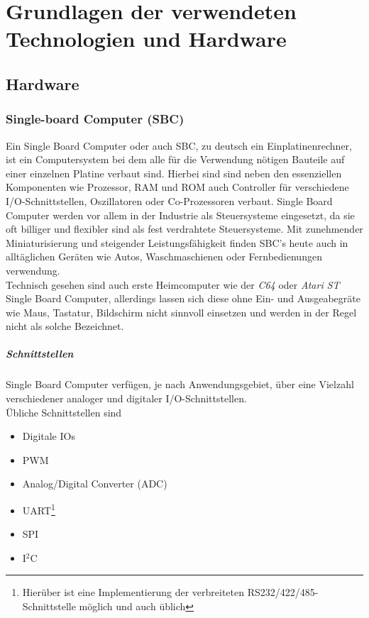 \documentclass[12pt, twoside, a4paper]{scrbook}
\begin{document}
\part[Grundlagen]{Grundlagen der verwendeten Technologien und Hardware}

\chapter{Hardware}

\section{Single-board Computer (SBC)}
Ein Single Board Computer oder auch SBC, zu deutsch ein Einplatinenrechner, ist ein Computersystem bei dem alle für die Verwendung nötigen Bauteile auf einer einzelnen Platine verbaut sind. Hierbei sind sind neben den essenziellen Komponenten wie Prozessor, RAM und ROM auch Controller für verschiedene I/O-Schnittstellen, Oszillatoren oder Co-Prozessoren verbaut. Single Board Computer werden vor allem in der Industrie als Steuersysteme eingesetzt, da sie oft billiger und flexibler sind als fest verdrahtete Steuersysteme. Mit zunehmender Miniaturisierung und steigender Leistungsfähigkeit finden SBC's heute auch in alltäglichen Geräten wie Autos, Waschmaschienen oder Fernbedienungen verwendung.\\

Technisch gesehen sind auch erste Heimcomputer wie der \emph{C64} oder \emph{Atari ST} Single Board Computer, allerdings lassen sich diese ohne Ein- und Ausgeabegräte wie Maus, Tastatur, Bildschirm nicht sinnvoll einsetzen und werden in der Regel nicht als solche Bezeichnet.

\subsubsection{Schnittstellen}
Single Board Computer verfügen, je nach Anwendungsgebiet, über eine Vielzahl verschiedener analoger und digitaler I/O-Schnittstellen.\\

Übliche Schnittstellen sind

\begin{itemize}
  \item Digitale IOs
  \item PWM
  \item Analog/Digital Converter (ADC)
  \item UART\footnote{Hierüber ist eine Implementierung der verbreiteten RS232/422/485-Schnittstelle möglich und auch üblich}
  \item SPI
  \item I$^{2}$C
\end{itemize}
\end{document}
